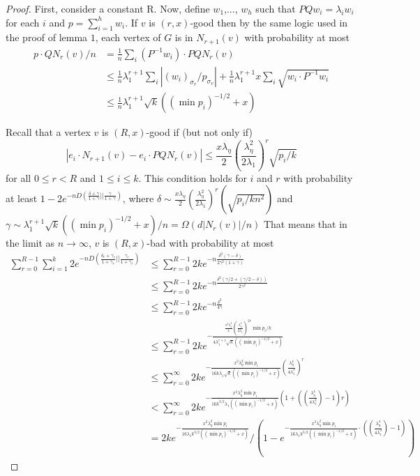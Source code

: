 \documentclass[11pt]{article}
\newcommand{\1}{\mathbb{1}}
\begin{document}
\begin{proof}
First, consider a constant R. Now, define $w_1$,..., $w_h$ such that $PQw_i=\lambda_iw_i$ for each $i$ and $p=\sum_{i=1}^h w_i$. If $v$ is $(r,x)$-good then by the same logic used in the proof of lemma $1$, each vertex of $G$ is in $N_{r+1}(v)$ with probability at most 
\begin{align*}
p\cdot QN_r(v)/n&=\frac{1}{n}\sum_i (P^{-1} w_i)\cdot PQN_r(v)\\
&\le \frac{1}{n}\lambda_1^{r+1}\sum_i |(w_i)_{\sigma_v}/p_{\sigma_v}|+\frac{1}{n}\lambda_1^{r+1}x\sum_i\sqrt{w_i\cdot P^{-1}w_i}\\
&\le \frac{1}{n}\lambda_1^{r+1}\sqrt{k}((\min p_i)^{-1/2}+x)
\end{align*}

 Recall that a vertex $v$ is $(R,x)$-good if (but not only if) \[|e_i\cdot N_{r+1}(v)-e_i\cdot PQN_r(v)|\le \frac{x\lambda_{\eta}}{2}\left(\frac{\lambda_{\eta}^2}{2\lambda_1}\right)^{r}\sqrt{p_i/k}\] for all $0\le r<R$ and $1\le i\le k$. This condition holds for $i$ and $r$ with probability at least $1-2e^{-nD(\frac{\delta+\gamma}{1+\gamma}||\frac{\gamma}{1+\gamma})}$, where $\delta\sim \frac{x\lambda_{\eta}}{2}(\frac{\lambda_{\eta}^2}{2\lambda_1})^{r}(\sqrt{p_i/kn^2})$ and $\gamma\sim \lambda_1^{r+1}\sqrt{k}((\min p_i)^{-1/2}+x)/n=\Omega(d|N_{r}(v)|/n)$ That means that in the limit as $n\to\infty$, $v$ is $(R,x)$-bad with probability at most 
\begin{align*}
\sum_{r=0}^{R-1}\sum_{i=1}^k 2e^{-nD(\frac{\delta_r+\gamma_r}{1+\gamma_r}||\frac{\gamma_r}{1+\gamma_r})}&\le \sum_{r=0}^{R-1} 2ke^{-n\frac{\delta^2(\gamma-\delta)}{2\gamma^2(1+\gamma)}}\\
&\le \sum_{r=0}^{R-1} 2ke^{-n\frac{\delta^2(\gamma/2+(\gamma/2-\delta))}{2\gamma^2}}\\
&\le \sum_{r=0}^{R-1} 2ke^{-n\frac{\delta^2}{4\gamma}}\\
&\le \sum_{r=0}^{R-1} 2ke^{-\frac{\frac{x^2\lambda_{\eta}^2}{4}\left(\frac{\lambda_{\eta}^2}{2\lambda_1}\right)^{2r}\min p_i/k}{4\lambda_1^{r+1}\sqrt{k}((\min p_i)^{-1/2}+x)}}\\
&\le \sum_{r=0}^\infty 2ke^{-\frac{x^2\lambda_{\eta}^2\min p_i}{16k\lambda_1\sqrt{k}((\min p_i)^{-1/2}+x)}\left(\frac{\lambda_{\eta}^4}{4\lambda_1^3}\right)^r}\\
&< \sum_{r=0}^\infty 2ke^{-\frac{x^2\lambda_{\eta}^2\min p_i}{16k^{3/2}\lambda_1((\min p_i)^{-1/2}+x)}\left(1+\left(\left(\frac{\lambda_{\eta}^4}{4\lambda_1^3}\right)-1\right)r\right)}\\
&=2ke^{-\frac{x^2\lambda_{\eta}^2\min p_i}{16\lambda_1k^{3/2}((\min p_i)^{-1/2}+x)}}/\left(1-e^{-\frac{x^2\lambda_{\eta}^2\min p_i}{16\lambda_1k^{3/2}((\min p_i)^{-1/2}+x)}\cdot((\frac{\lambda_{\eta}^4}{4\lambda_1^3})-1)}\right)
\end{align*}


\end{proof}
\end{document}
